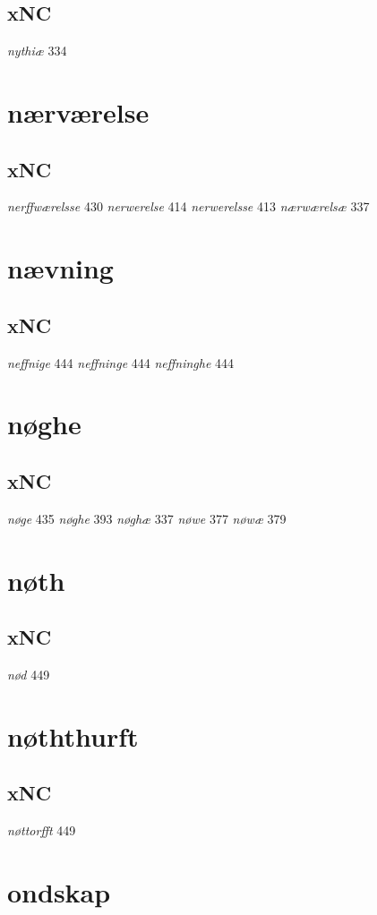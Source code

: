\documentclass[a4paper,twocolumn]{article}
\begin{document}
\subsection{xNC}
\label{sec:org44bc115}
\emph{nythiæ} 334 
\section{nærværelse}
\label{sec:org1f2e8a2}
\subsection{xNC}
\label{sec:org675b759}
\emph{nerffwærelsse} 430 \emph{nerwerelse} 414 \emph{nerwerelsse} 413 \emph{nærwærelsæ} 337 
\section{nævning}
\label{sec:org2ee214c}
\subsection{xNC}
\label{sec:org81d3471}
\emph{neffnige} 444 \emph{neffninge} 444 \emph{neffninghe} 444 
\section{nøghe}
\label{sec:org84d3a46}
\subsection{xNC}
\label{sec:org6547f6d}
\emph{nøge} 435 \emph{nøghe} 393 \emph{nøghæ} 337 \emph{nøwe} 377 \emph{nøwæ} 379 
\section{nøth}
\label{sec:org87e814b}
\subsection{xNC}
\label{sec:org2030f38}
\emph{nød} 449 
\section{nøththurft}
\label{sec:org8148840}
\subsection{xNC}
\label{sec:orgd58c618}
\emph{nøttorfft} 449 
\section{ondskap}
\label{sec:orgc54cb7a}
\end{document}

